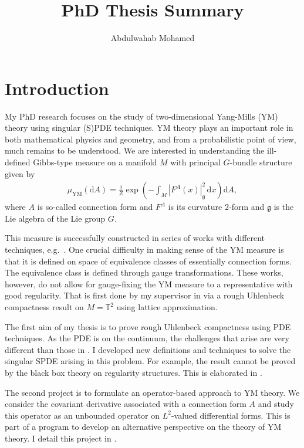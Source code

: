 \documentclass[12pt]{article}
\title{PhD Thesis Summary}
\author{Abdulwahab Mohamed}
\date{}
\numberwithin{equation}{section}
\theoremstyle{definition}
\theoremstyle{remark}
\newcommand{\diff}{\mathrm{d}}
\newcommand{\1}{\mathbf 1}
\newcommand{\<}{\langle}
\renewcommand{\>}{\rangle}
\newcommand{\fg}{\mathfrak g}
\newcommand{\bT}{\mathbb T}
\begin{document}
\maketitle
{}
\section{Introduction}
My PhD research focuses on the study of two-dimensional Yang-Mills (YM) theory using singular (S)PDE techniques. YM theory plays an important role in both mathematical physics and geometry, and from a probabilistic point of view, much remains to be understood. We are interested in understanding the ill-defined Gibbs-type measure on a manifold $M$ with principal $G$-bundle structure given by
\begin{align}\label{eq:YM_measure}
\mu_{\mathrm{YM}}(\diff A)=\frac 1 Z\exp\left(-\int_{M}|F^A(x)|_{\mathfrak g}^2\,\diff x\right)\diff A,
\end{align}
where $A$ is so-called connection form and $F^A$ is its curvature $2$-form and $\fg$ is the Lie algebra of the Lie group $G$. 
%

This measure is successfully constructed in series of works with different techniques, e.g.\ \cite{Driver89,GKS89,Sengupta97,Levy03}. One crucial difficulty in making sense of the YM measure is that it is defined on space of equivalence classes of essentially connection forms. The equivalence class is defined through gauge transformations.   These works, however, do not allow for gauge-fixing the YM measure to a representative with good regularity. That is first done by my supervisor in \cite{Chevyrev19} via a rough Uhlenbeck compactness result on $M=\bT^2$ using lattice approximation.  

The first aim of my thesis is to prove rough Uhlenbeck compactness using PDE techniques. As the PDE is on the continuum, the challenges that arise are very different than those in \cite{Chevyrev19}. I developed new definitions and techniques to solve the singular SPDE arising in this problem. For example, the result cannot be proved by the black box theory on regularity structures. This is elaborated in . 

The second project is to formulate an operator-based approach to YM theory. We consider the covariant derivative associated with a connection form $A$ and study this operator as an unbounded operator on $L^2$-valued differential forms. This is part of a program to develop an alternative perspective on the theory of YM theory. I detail this project in . 
\end{document}
